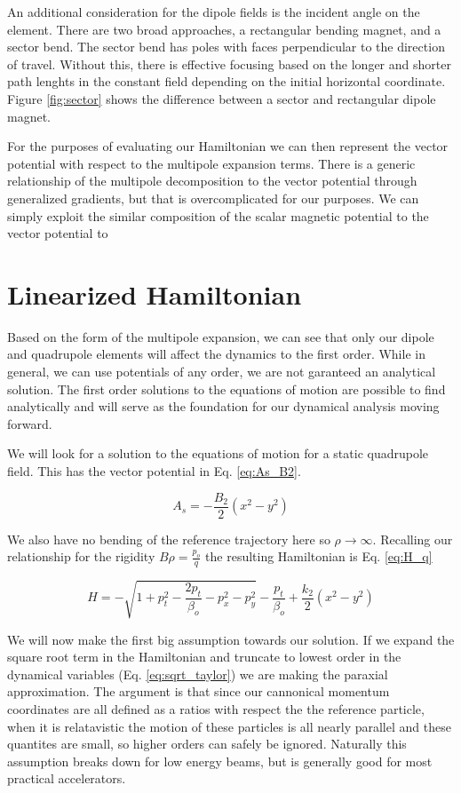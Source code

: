An additional consideration for the dipole fields is the incident angle on the element. There are two broad approaches, a rectangular bending magnet, and a sector bend. The sector bend has poles with faces perpendicular to the direction of travel. Without this, there is effective focusing based on the longer and shorter path lenghts in the constant field depending on the initial horizontal coordinate. Figure \ref{fig:sector} shows the difference between a sector and rectangular dipole magnet.

For the purposes of evaluating our Hamiltonian we can then represent the vector potential with respect to the multipole expansion terms. There is a generic relationship of the multipole decomposition to the vector potential through generalized gradients, but that is overcomplicated for our purposes. We can simply exploit the similar composition of the scalar magnetic potential to the vector potential to 


\section{Linearized Hamiltonian} \label{sec:linHam}
Based on the form of the multipole expansion, we can see that only our dipole and quadrupole elements will affect the dynamics to the first order. While in general, we can use potentials of any order, we are not garanteed an analytical solution. The first order solutions to the equations of motion are possible to find analytically and will serve as the foundation for our dynamical analysis moving forward.

We will look for a solution to the equations of motion for a static quadrupole field. This has the vector potential in Eq. \ref{eq:As_B2}.

\begin{equation} \label{eq:As_B2}
	A_s = -\frac{B_2}{2}(x^2 - y^2)
\end{equation}

We also have no bending of the reference trajectory here so $\rho \rightarrow \infty$. Recalling our relationship for the rigidity $B\rho = \frac{p_o}{q}$ the resulting Hamiltonian is Eq. \ref{eq:H_q}

\begin{equation} \label{eq:H_q}
	H = -\sqrt{1 + p_t^2 - \frac{2p_t}{\beta_o} - p_x^2 - p_y^2} - \frac{p_t}{\beta_o} + \frac{k_2}{2}(x^2 - y^2)
\end{equation}

We will now make the first big assumption towards our solution. If we expand the square root term in the Hamiltonian and truncate to lowest order in the dynamical variables (Eq. \ref{eq:sqrt_taylor}) we are making the paraxial approximation. The argument is that since our cannonical momentum coordinates are all defined as a ratios with respect the the reference particle, when it is relatavistic the motion of these particles is all nearly parallel and these quantites are small, so higher orders can safely be ignored. Naturally this assumption breaks down for low energy beams, but is generally good for most practical accelerators.

